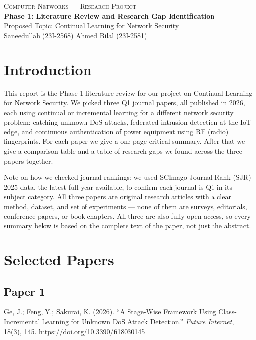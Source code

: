 \documentclass[10pt]{article}
\begin{document}
\pagestyle{plain}

\begin{center}
	{\small \textsc{Computer Networks --- Research Project}}\\[4pt]
	{\LARGE \textbf{Phase 1: Literature Review and Research Gap Identification}}\\[6pt]
	{\large Proposed Topic: Continual Learning for Network Security}\\[10pt]
	{\normalsize Saneedullah (23I-2568) \quad\textbar\quad Ahmed Bilal (23I-2581)}
\end{center}

\vspace{4mm}

\section{Introduction}

This report is the Phase 1 literature review for our project on Continual Learning for Network Security. We picked three Q1 journal papers, all published in 2026, each using continual or incremental learning for a different network security problem: catching unknown DoS attacks, federated intrusion detection at the IoT edge, and continuous authentication of power equipment using RF (radio) fingerprints. For each paper we give a one-page critical summary. After that we give a comparison table and a table of research gaps we found across the three papers together.

Note on how we checked journal rankings: we used SCImago Journal Rank (SJR) 2025 data, the latest full year available, to confirm each journal is Q1 in its subject category. All three papers are original research articles with a clear method, dataset, and set of experiments --- none of them are surveys, editorials, conference papers, or book chapters. All three are also fully open access, so every summary below is based on the complete text of the paper, not just the abstract.

\section{Selected Papers}

\subsection*{Paper 1}
Ge, J.; Feng, Y.; Sakurai, K. (2026). \enquote{A Stage-Wise Framework Using Class-Incremental Learning for Unknown DoS Attack Detection.} \textit{Future Internet}, 18(3), 145. \url{https://doi.org/10.3390/fi18030145}
\end{document}
